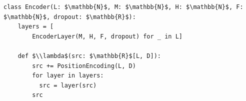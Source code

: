 \documentclass[border=10pt]{standalone}
\begin{document}
\begin{lstlisting}
class Encoder(L: $\mathbb{N}$, M: $\mathbb{N}$, H: $\mathbb{N}$, F: $\mathbb{N}$, dropout: $\mathbb{R}$):
    layers = [
        EncoderLayer(M, H, F, dropout) for _ in L]

    def $\\lambda$(src: $\mathbb{R}$[L, D]):
        src += PositionEncoding(L, D)
        for layer in layers:
          src = layer(src)
        src
\end{lstlisting}
\end{document}
